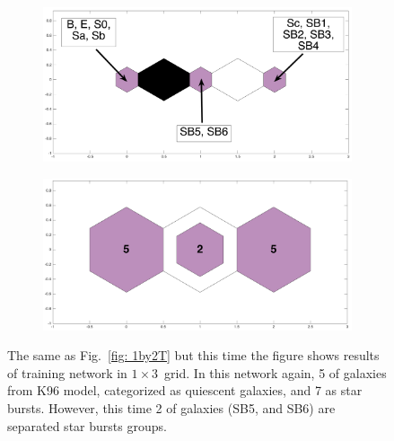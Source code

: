             \begin{figure}
                \begin{subfigure}[b]{0.5\textwidth}
                    \centering
                    \includegraphics[width=\textwidth]{../images0.01/1d/dist_1_by_3.png}
                \end{subfigure}
                \hfill
                \begin{subfigure}[b]{0.5\textwidth}
                     \includegraphics[width=\textwidth]{../images0.01/1d/hit_t_1_by_3.png}
                \end{subfigure}
                \caption{The same as Fig.~\ref{fig: 1by2T} but this time the figure shows results of training network in $1\times3$~grid. In this network again, 5 of galaxies from K96 model, categorized as quiescent galaxies, and 7 as star bursts. However, this time 2 of galaxies (SB5, and SB6) are separated star bursts groups.}
                 \label{fig: 1by3T}
            \end{figure}
           
